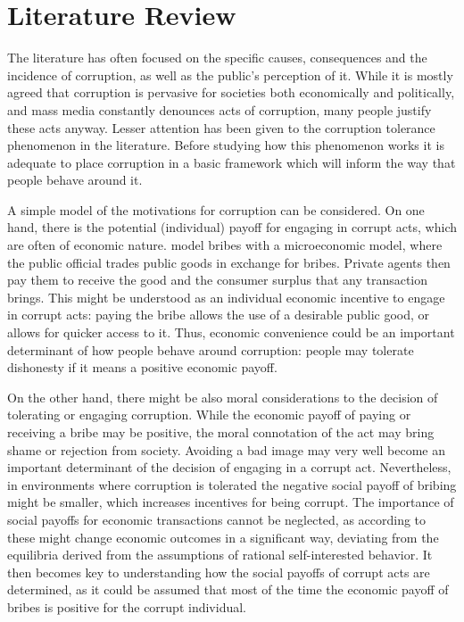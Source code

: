 \documentclass[12pt,a4]{article}\usepackage[]{graphicx}\usepackage[]{xcolor}
\begin{document}


\section{Literature Review}

The literature has often focused on the specific causes, consequences and the incidence of corruption, as well as the public's perception of it. While it is mostly agreed that corruption is pervasive for societies both economically and politically, and mass media constantly denounces acts of corruption, many people justify these acts anyway. Lesser attention has been given to the corruption tolerance phenomenon in the literature. Before studying how this phenomenon works it is adequate to place corruption in a basic framework which will inform the way that people behave around it. 

A simple model of the motivations for corruption can be considered. On one hand, there is the potential (individual) payoff for engaging in corrupt acts, which are often of economic nature. \textcite{Shleifer.1993} model bribes with a microeconomic model, where the public official trades public goods in exchange for bribes. Private agents then pay them to receive the good and the consumer surplus that any transaction brings. This might be understood as an individual economic incentive to engage in corrupt acts: paying the bribe allows the use of a desirable public good, or allows for quicker access to it. Thus, economic convenience could be an important determinant of how people behave around corruption: people may tolerate dishonesty if it means a positive economic payoff. 

On the other hand, there might be also moral considerations to the decision of tolerating or engaging corruption. While the economic payoff of paying or receiving a bribe may be positive, the moral connotation of the act may bring shame or rejection from society. Avoiding a bad image may very well become an important determinant of the decision of engaging in a corrupt act. Nevertheless, in environments where corruption is tolerated the negative social payoff of bribing might be smaller, which increases incentives for being corrupt. The importance of social payoffs for economic transactions cannot be neglected, as according to \textcite{Akerlof.1980} these might change economic outcomes in a significant way, deviating from the equilibria derived from the assumptions of rational self-interested behavior. It then becomes key to understanding how the social payoffs of corrupt acts are determined, as it could be assumed that most of the time the economic payoff of bribes is positive for the corrupt individual. 
\end{document}
